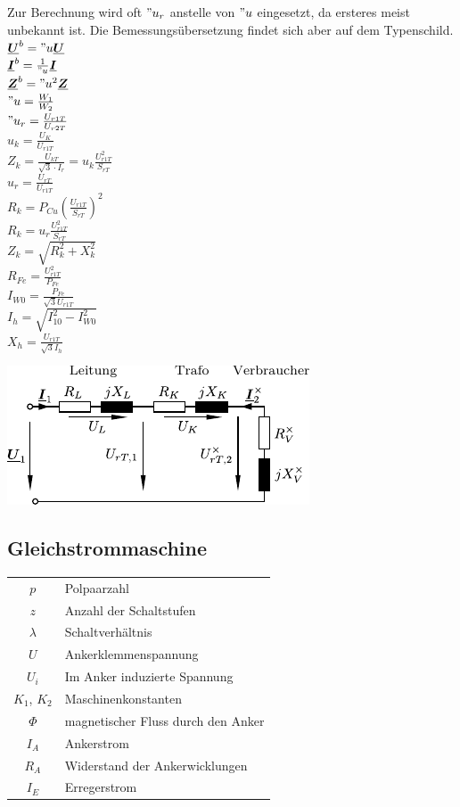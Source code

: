 \documentclass[fs, footer]{latex4ei}
\begin{document}
\begin{multicols}{4}
    Zur Berechnung wird oft $"u_r$ anstelle von $"u$ eingesetzt, da ersteres meist unbekannt ist. Die Bemessungsübersetzung findet sich aber auf dem Typenschild. \\
    $\vec U^b = "u \vec U$ \\
    $\vec I^b = \frac{1}{"u} \vec I$ \\
    $\vec Z^b = "u^2 \vec Z$ \\
    $"u = \frac{W_1}{W_2}$ \\
    $"u_r = \frac{U_{r1T}}{U_{r2T}}$ \\
    $u_k = \frac{U_{K}}{U_{r1T}}$ \\
    $Z_k = \frac{U_{kT}}{\sqrt{3}\cdot I_r} = u_k \frac{U_{r1T}^2}{S_{rT}}$ \\
    $u_r = \frac{U_{rT}}{U_{r1T}}$ \\
    $R_k = P_{Cu} \left( \frac{U_{r1T}}{S_{rT}} \right)^2$ \\
    $R_k = u_r \frac{U_{r1T}^2}{S_{rT}}$ \\
    $Z_k = \sqrt{R_k^2 + X_k^2}$ \\
    $R_{Fe} = \frac{U_{r1T}^2}{P_{Fe}}$ \\
    $I_{W0} = \frac{P_{Fe}}{\sqrt{3} U_{r1T}}$ \\
    $I_h = \sqrt{I_{10}^2 - I_{W0}^2}$ \\
    $X_h = \frac{U_{r1T}}{\sqrt{3} I_h}$


    \includegraphics{./img/LeitungTrafo.pdf}

    \subsection{Gleichstrommaschine}

    \begin{tabular}{cl}
        $p$          & Polpaarzahl                        \\
        $z$          & Anzahl der Schaltstufen            \\
        $\lambda$    & Schaltverhältnis                   \\
        $U$          & Ankerklemmenspannung               \\
        $U_i$        & Im Anker induzierte Spannung       \\
        $K_1$, $K_2$ & Maschinenkonstanten                \\
        $\Phi$       & magnetischer Fluss durch den Anker \\
        $I_A$        & Ankerstrom                         \\
        $R_A$        & Widerstand der Ankerwicklungen     \\
        $I_E$        & Erregerstrom
    \end{tabular}


\end{multicols}
\end{document}
